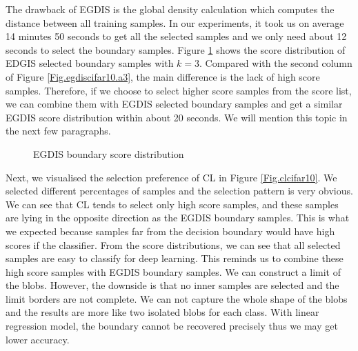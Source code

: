 The drawback of EGDIS is the global density calculation which computes the distance between all training samples. In our experiments, it took us on average 14 minutes 50 seconds to get all the selected samples and we only need about 12 seconds to select the boundary samples. Figure \ref{Fig.egdisboscores} shows the score distribution of EDGIS selected boundary samples with $k=3$. Compared with the second column of Figure \ref{Fig.egdiscifar10.a3}, the main difference is the lack of high score samples. Therefore, if we choose to select higher score samples from the score list, we can combine them with EGDIS selected boundary samples and get a similar EGDIS score distribution within about 20 seconds. We will mention this topic in the next few paragraphs.

\begin{figure}[H]
\centering  
{}
\caption{EGDIS boundary score distribution}
\label{Fig.egdisboscores}
\end{figure}

Next, we visualised the selection preference of CL in Figure \ref{Fig.clcifar10}. We selected different percentages of samples and the selection pattern is very obvious. We can see that CL tends to select only high score samples, and these samples are lying in the opposite direction as the EGDIS boundary samples. This is what we expected because samples far from the decision boundary would have high scores if the classifier.  From the score distributions, we can see that all selected samples are easy to classify for deep learning. This reminds us to combine these high score samples with EGDIS boundary samples. We can construct a limit of the blobs. However, the downside is that no inner samples are selected and the limit borders are not complete. We can not capture the whole shape of the blobs and the results are more like two isolated blobs for each class. With linear regression model, the boundary cannot be recovered precisely thus we may get lower accuracy.

